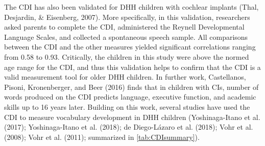 \documentclass[english,man]{apa6}
\begin{document}
The CDI has also been validated for DHH children with cochlear implants (Thal, Desjardin, \& Eisenberg, 2007). More specifically, in this validation, researchers asked parents to complete the CDI, administered the Reynell Developmental Language Scales, and collected a spontaneous speech sample. All comparisons between the CDI and the other measures yielded significant correlations ranging from 0.58 to 0.93. Critically, the children in this study were above the normed age range for the CDI, and thus this validation helps to confirm that the CDI is a valid measurement tool for older DHH children. In further work, Castellanos, Pisoni, Kronenberger, and Beer (2016) finds that in children with CIs, number of words produced on the CDI predicts language, executive function, and academic skills up to 16 years later. Building on this work, several studies have used the CDI to measure vocabulary development in DHH children (Yoshinaga-Itano et al. (2017); Yoshinaga-Itano et al. (2018); de Diego-Lázaro et al. (2018); Vohr et al. (2008); Vohr et al. (2011); summarized in \ref{tab:CDIsummary}).

\begin{table}

\caption{\label{tab:CDIsummary}Summary of findings of CDI studies in DHH children}
\centering
{}
\end{table}
\end{document}

